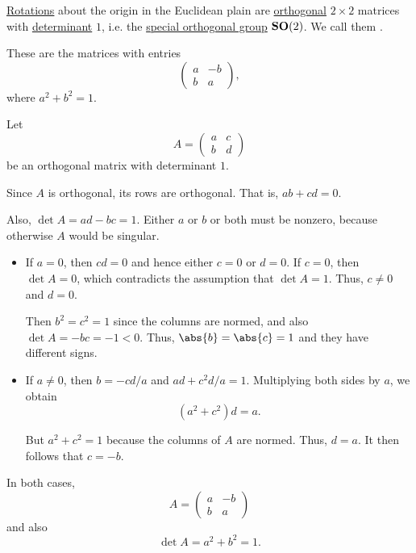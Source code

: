 \begin{proposition}\label{thm:plane_rotation_matrix}
  \hyperref[def:rigid_motion/rotation]{Rotations} about the origin in the Euclidean plain are \hyperref[def:unitary_matrix]{orthogonal} \( 2 \times 2 \) matrices with \hyperref[def:matrix_determinant]{determinant} \( 1 \), i.e. the \hyperref[def:unitary_groups]{special orthogonal group} \( \grp{SO}(2) \). We call them .

  These are the matrices with entries
  \begin{equation}\label{eq:thm:plane_rotation_matrix}
    \begin{pmatrix}
      a & -b \\
      b & a
    \end{pmatrix},
  \end{equation}
  where \( a^2 + b^2 = 1 \).
\end{proposition}
\begin{defproof}
  Let
  \begin{equation*}
    A = \begin{pmatrix}
      a & c \\
      b & d
    \end{pmatrix}
  \end{equation*}
  be an orthogonal matrix with determinant \( 1 \).

  Since \( A \) is orthogonal, its rows are orthogonal. That is, \( ab + cd = 0 \).

  Also, \( \det A = ad - bc = 1 \). Either \( a \) or \( b \) or both must be nonzero, because otherwise \( A \) would be singular.
  \begin{itemize}
    \item If \( a = 0 \), then \( cd = 0 \) and hence either \( c = 0 \) or \( d = 0 \). If \( c = 0 \), then \( \det A = 0 \), which contradicts the assumption that \( \det A = 1 \). Thus, \( c \neq 0 \) and \( d = 0 \).

    Then \( b^2 = c^2 = 1 \) since the columns are normed, and also \( \det A = -bc = -1 < 0 \). Thus, \( \abs{b} = \abs{c} = 1 \) and they have different signs.

    \item If \( a \neq 0 \), then \( b = -cd / a \) and \( ad + c^2 d / a = 1 \). Multiplying both sides by \( a \), we obtain
    \begin{equation*}
      (a^2 + c^2) d = a.
    \end{equation*}

    But \( a^2 + c^2 = 1 \) because the columns of \( A \) are normed. Thus, \( d = a \). It then follows that \( c = -b \).
  \end{itemize}

  In both cases,
  \begin{equation*}
    A
    =
    \begin{pmatrix}
      a & -b \\
      b & a
    \end{pmatrix}
  \end{equation*}
  and also
  \begin{equation*}
    \det A = a^2 + b^2 = 1.
  \end{equation*}
\end{defproof}

